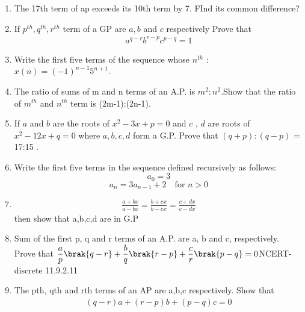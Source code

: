 \begin{enumerate}[label=\thesection.\arabic*,ref=\thesection.\theenumi]
\item The 17th term of ap exceeds its 10th term by 7. FInd its common difference?\\
 \solution

 \pagebreak
 \item If $p^{th},q^{th},r^{th} $ term of a GP are $a,b$ and $c$  respectively Prove that \\
\begin{align*}
    a^{q-r}b^{r-p}c^{p-q}=1
\end{align*}
\solution

\pagebreak

\item Write the first five terms of the sequence whose $n^{th}$  : $x(n) = (-1)^{n-1}5^{n+1}$.\\
\solution

\pagebreak
\item The ratio of sums of m and n terms of an A.P. is $m^2:n^2$.Show
that the ratio of $m^{th}$ and $n^{th}$ term is (2m-1):(2n-1).\\
\solution
\pagebreak

\item If $a$ and $b$ are the roots of $x^{2} -3x + p = 0$ and $c$ , $d$ are roots of $x^{2} - 12x + q = 0$ where $a,b,c,d$ form a G.P. Prove that $(q+p) : (q-p)$ = 17:15 .\\
\solution
\pagebreak


\item Write the first five terms in the sequence defined recursively as follows:
\[ a_{0} = 3 \]
\[ a_{n} = 3a_{n-1} + 2 \quad \text{for } n > 0 \]
\solution 
\pagebreak


\item \begin{align}
\frac{a+bx}{a-bx}=\frac{b+cx}{b-cx}=\frac{c+dx}{c-dx}
\end{align}
then show that a,b,c,d are in G.P\\
\solution

\pagebreak


\item Sum of the first p, q and r terms of an A.P. are a, b and c, respectively.\\
Prove that $\dfrac{a}{p}\brak{q-r}+\dfrac{b}{q}\brak{r-p}+\dfrac{c}{r}\brak{p-q}=0$\hfill{NCERT-discrete 11.9.2.11}\\
\solution

\pagebreak

\item The pth, qth and rth terms of an AP are a,b,c respectively. Show that
\begin{align*} (q-r)a + (r-p)b +(p-q)c =0 \end{align*}
\solution

\pagebreak


\end{enumerate}
